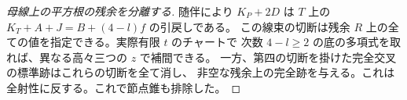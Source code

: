 \begin{proof}[母線上の平方根の残余を分離する]
随伴により $K_P+2D$ は $T$ 上の $K_T+A+J=B+(4-l)f$ の引戻しである。
この線束の切断は残余 $R$ 上の全ての値を指定できる。実際有限 $t$ のチャートで
次数 $4-l\ge2$ の底の多項式を取れば、異なる高々三つの $z$ で補間できる。
一方、第四の切断を掛けた完全交叉の標準跡はこれらの切断を全て消し、
非空な残余上の完全跡を与える。これは全射性に反する。これで節点錐も排除した。
\end{proof}
